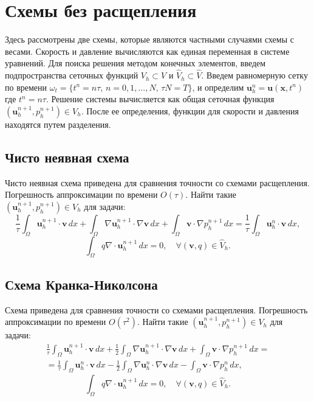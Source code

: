 \documentclass[12pt]{article}
\begin{document}
\section{Схемы без расщепления}
Здесь рассмотрены две схемы, которые являются частными случаями схемы с весами.
Скорость и давление вычисляются как единая переменная в системе уравнений. 
Для поиска решения методом конечных элементов, введем подпространства сеточных функций $V_h \subset V$ и  ${\hat V}_h \subset {\hat V}$.
Введем равномерную сетку по времени $\omega_t=\{t^n=n\tau, \, n=0,1,...,N, \, \tau N = T \}$, и определим ${\bm u}_h^n={\bm u}({\bm x}, t^n)$ где $t^n=n\tau$. Решение системы вычисляется как общая сеточная функция $({\bm u}_h^{n+1}, p_h^{n+1}) \in V_h$. После ее определения, функции для скорости и давления находятся путем разделения.

\subsection{Чисто неявная схема} 
Чисто неявная схема приведена для сравнения точности со схемами расщепления. 
Погрешность аппроксимации по времени $O(\tau)$.
Найти такие $({\bm u}_h^{n+1}, p_h^{n+1}) \in V_h$ для задачи:
\begin{equation} \label{eq:scheme-impl-1}
\frac{1}{\tau} \int_\Omega {\bm u_h^{n+1}} \cdot {\bm v} \, dx + \int_\Omega \nabla {\bm u_h^{n+1}} \cdot \nabla {\bm v} \, dx + \int_\Omega {\bm v} \cdot \nabla p_h^{n+1} \, dx = \frac{1}{\tau} \int_\Omega {\bm u}_h^n \cdot {\bm v} \, dx, 
\end{equation}
$$
\int_\Omega q \nabla \cdot {\bm u_h^{n+1}} \, dx = 0, \quad \forall ({\bm v},q) \in \hat V_h.
$$

\subsection{Схема Кранка-Николсона} 
Схема приведена для сравнения точности со схемами расщепления.
Погрешность аппроксимации по времени $O(\tau^2)$.
Найти такие $({\bm u}_h^{n+1}, p_h^{n+1}) \in V_h$ для задачи:
\begin{eqnarray*}
\frac{1}{\tau} \int_\Omega {\bm u_h^{n+1}} \cdot {\bm v} \, dx + \frac{1}{2} \int_\Omega \nabla {\bm u_h^{n+1}} \cdot \nabla {\bm v} \, dx + \int_\Omega {\bm v} \cdot \nabla p_h^{n+1} \, dx = \nonumber\\  = \frac{1}{\tau} \int_\Omega {\bm u}_h^n \cdot {\bm v} \, dx - \frac{1}{2} \int_\Omega \nabla {\bm u}_h^n \cdot \nabla {\bm v} \, dx - \int_\Omega {\bm v} \cdot \nabla p_h^{n} \, dx ,
\end{eqnarray*}
$$
\int_\Omega q \nabla \cdot {\bm u_h^{n+1}} \, dx = 0, \quad \forall ({\bm v},q) \in \hat V_h.
$$
\end{document}
